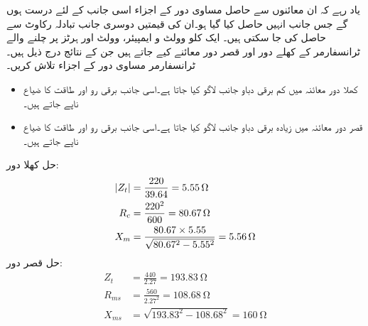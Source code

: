 یاد رہے کہ ان معائنوں سے حاصل مساوی دور کے  اجزاء اسی جانب کے لئے درست ہوں گے جس جانب انہیں حاصل کیا گیا ہو۔ان کی قیمتیں دوسری جانب تبادلہ رکاوٹ سے حاصل کی جا سکتی ہیں۔ 
%
ایک   کلو وولٹ و ایمپیئر،  وولٹ اور  ہرٹز پر چلنے والے ٹرانسفارمر کے کھلے دور اور قصر دور معائنے کیے جاتے ہیں جن کے نتائج درج ذیل ہیں۔ ٹرانسفارمر مساوی دور کے اجزاء تلاش کریں۔
\begin{itemize}
\item
کھلا دور معائنہ میں کم برقی دباو جانب   لاگو کیا جاتا ہے۔اسی جانب برقی رو  اور طاقت کا ضیاع  ناپے جاتے ہیں۔
\item
قصر دور معائنہ میں زیادہ برقی دباو جانب   لاگو کیا جاتا ہے۔اسی جانب برقی رو  اور طاقت کا ضیاع  ناپے جاتے ہیں۔
\end{itemize}

حل کھلا دور:
\begin{align*}
\abs{Z_t}&=\frac{220}{39.64}=\SI{5.55}{\ohm}\\
R_c&=\frac{220^2}{600}=\SI{80.67}{\ohm}\\
X_m&=\frac{80.67 \times 5.55}{\sqrt{80.67^2-5.55^2}}=\SI{5.56}{\ohm}
\end{align*}
حل قصر دور:
\begin{align*}
Z_t&=\frac{440}{2.27}=\SI{193.83}{\ohm}\\
R_{ms}&=\frac{560}{2.27^2}=\SI{108.68}{\ohm}\\
X_{ms}&=\sqrt{193.83^2-108.68^2}=\SI{160}{\ohm}
\end{align*}

